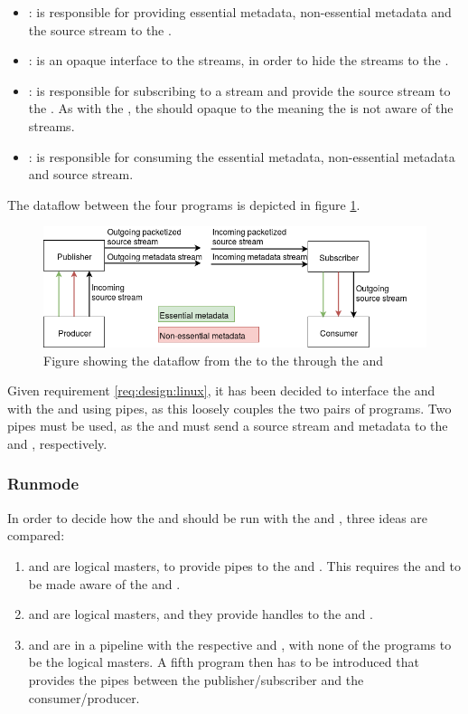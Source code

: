 \begin{itemize}
	\item \pro: is responsible for providing essential metadata, non-essential metadata and the source stream to the \pub.
	
	\item \pub: is an opaque interface to the streams, in order to hide the streams to the \pro{}. 
	
	\item \sub{}: is responsible for subscribing to a stream and provide the source stream to the \con{}. As with the \pub{}, the \sub{} should opaque to the \con{} meaning the \con{} is not aware of the streams. 
	
	\item \con{}: is responsible for consuming the essential metadata, non-essential metadata and source stream.
\end{itemize}

The dataflow between the four programs is depicted in figure \ref{fig:design:pubsub}.
\begin{figure}[H]
	\centering
	\includegraphics[width=1\textwidth]{figures/publisher-subscriber}
	\caption{Figure showing the dataflow from the \pro{} to the \con{} through the \pub{} and \sub{}} \label{fig:design:pubsub}
\end{figure}


Given requirement \ref{req:design:linux}, it has been decided to interface the \pubs{} and \subs{} with the \pros{} and \cons{} using pipes, as this loosely couples the two pairs of programs. Two pipes must be used, as the \pros{} and \subs{} must send a source stream and metadata to the \pubs{} and \cons, respectively.

\subsubsection*{Runmode}
In order to decide how the \pubs{} and \subs{} should be run with the \pros{} and \cons{}, three ideas are compared:
\begin{enumerate}
	\item \cons{} and \pros{} are logical masters, to provide pipes to the \pubs{} and \subs{}. This requires the \cons{} and \pros{} to be made aware of the \subs{} and \pubs{}. 
	\item \subs{} and \pubs{} are logical masters, and they provide handles to the \cons{} and \subs{}.
	\item \subs{} and \pubs{} are in a pipeline with the respective \cons{} and \pros{}, with none of the programs to be the logical masters. A fifth program then has to be introduced that provides the pipes between the publisher/subscriber and the consumer/producer.
\end{enumerate}

